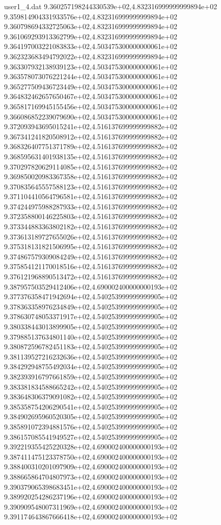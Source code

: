 \begin{filecontents}{user1_4.dat}
9.360257198244330539e+02,4.832316999999999894e+02
9.359814904331933576e+02,4.832316999999999894e+02
9.360798694332725063e+02,4.832316999999999894e+02
9.361069293913362799e+02,4.832316999999999894e+02
9.364197003221083833e+02,4.503475300000000061e+02
9.362323683494792022e+02,4.832316999999999894e+02
9.363307932138939123e+02,4.503475300000000061e+02
9.363578073076221244e+02,4.503475300000000061e+02
9.365277509436723449e+02,4.503475300000000061e+02
9.364832462657650467e+02,4.503475300000000061e+02
9.365817169945155456e+02,4.503475300000000061e+02
9.366086852239079690e+02,4.503475300000000061e+02
9.372093943695015241e+02,4.516137699999999882e+02
9.367341241820508912e+02,4.516137699999999882e+02
9.368326407751371789e+02,4.516137699999999882e+02
9.368595631401938135e+02,4.516137699999999882e+02
9.370297820629114085e+02,4.516137699999999882e+02
9.369850020983367358e+02,4.516137699999999882e+02
9.370835645557588123e+02,4.516137699999999882e+02
9.371104410564796581e+02,4.516137699999999882e+02
9.374244975988287933e+02,4.516137699999999882e+02
9.372358800146225803e+02,4.516137699999999882e+02
9.373344883363802182e+02,4.516137699999999882e+02
9.373613189727655026e+02,4.516137699999999882e+02
9.375318131821506995e+02,4.516137699999999882e+02
9.374867579309084249e+02,4.516137699999999882e+02
9.375854121170018516e+02,4.516137699999999882e+02
9.376121968890513472e+02,4.516137699999999882e+02
9.387957503529412406e+02,4.690002400000000193e+02
9.377376358471942694e+02,4.540253999999999905e+02
9.378363358976234849e+02,4.540253999999999905e+02
9.378630748053371917e+02,4.540253999999999905e+02
9.380338443013899905e+02,4.540253999999999905e+02
9.379885137634801140e+02,4.540253999999999905e+02
9.380872596782451183e+02,4.540253999999999905e+02
9.381139527216232636e+02,4.540253999999999905e+02
9.384292948755492034e+02,4.540253999999999905e+02
9.382393916797661859e+02,4.540253999999999905e+02
9.383381834588665242e+02,4.540253999999999905e+02
9.383648306379091082e+02,4.540253999999999905e+02
9.385358754206290541e+02,4.540253999999999905e+02
9.384902695960520305e+02,4.540253999999999905e+02
9.385891072394881576e+02,4.540253999999999905e+02
9.386157085541949527e+02,4.540253999999999905e+02
9.392219355425220328e+02,4.690002400000000193e+02
9.387411475123378750e+02,4.690002400000000193e+02
9.388400310201097909e+02,4.690002400000000193e+02
9.388665864704807973e+02,4.690002400000000193e+02
9.390379065398683451e+02,4.690002400000000193e+02
9.389920254286237196e+02,4.690002400000000193e+02
9.390909548007311969e+02,4.690002400000000193e+02
9.391174643867666418e+02,4.690002400000000193e+02

\end{filecontents}
